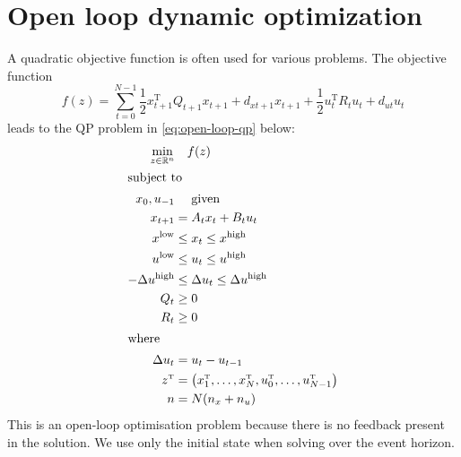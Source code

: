 \documentclass[a4paper, 12pt]{article}
\theoremstyle{definition}
\newcommand{\T}{^{\scriptscriptstyle \text{T}}}
\begin{document}
\section{Open loop dynamic optimization}
A quadratic objective function is often used for various problems. The objective function
\begin{equation}
	{f(z)}
	=
	\sum_{t=0}^{N-1}
		\frac{1}{2} x_{t+1}\T Q_{t+1} x_{t+1}
		+
		d_{xt+1} x_{t+1}
		+
		\frac{1}{2} u_t\T R_t u_t
		+
		d_{ut} u_t
\end{equation}
leads to the QP problem in \eqref{eq:open-loop-qp} below:
\begin{subequations}\label{eq:open-loop-qp}
\begin{align}
	\underset
		{z \in \mathbb{R}^n}
		{\min}
	&\quad
	f(z) \\
	\intertext{subject to}
	x_0, u_{-1}             &\quad \text{ given}                                           \\
	x_{t+1}                 &= A_t x_t + B_t u_t                                           \\
	x^{\text{low}}          &\leq x_t \leq x^{\text{high}}                                 \\
	u^{\text{low}}          &\leq u_t \leq u^{\text{high}}                                 \\
	-\Delta u^{\text{high}} &\leq \Delta u_t \leq \Delta u^{\text{high}}                   \\
	Q_t                     &\geq 0                                                        \\
	R_t                     &\geq 0                                                        \\
	\intertext{where}
	\Delta u_t              &= u_t - u_{t-1}                                               \\
	z\T                     &= \left( x_1\T, \dots, x_N\T, u_0\T, \dots, u_{N-1}\T \right) \\
	n                       &= N (n_x + n_u)
\end{align}
\end{subequations}
This is an open-loop optimisation problem because there is no feedback present in the solution. We use only the initial state when solving over the event horizon.

\end{document}
